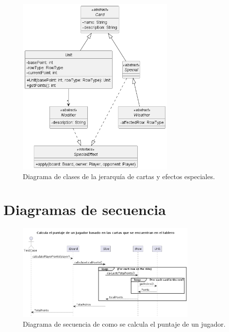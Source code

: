 \documentclass[titlepage,a4paper]{article}
\begin{document}
\begin{figure}[H]
    \centering
    \includegraphics[width=0.7\textwidth]{../../../diagrams/classes/cards.png}
    \caption{Diagrama de clases de la jerarquía de cartas y efectos especiales.}
\end{figure}



\section{Diagramas de secuencia}\label{sec:diagramasdesecuencia}


\begin{figure}[H]
    \centering
    \includegraphics[width=0.8\textwidth]{../../../diagrams/sequences/DiagramaDeSecuencia1.png}
    \caption{Diagrama de secuencia de como se calcula el puntaje de un jugador.}
\end{figure}
\end{document}
